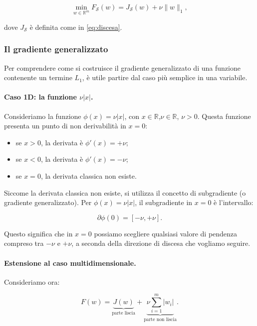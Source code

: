 \documentclass[a4paper,12pt]{article}
\numberwithin{equation}{section}
\numberwithin{figure}{section}
\numberwithin{table}{section}
\begin{document}
\begin{equation}
\min_{w \in \mathbb{R}^m} F_{\mathcal{S}}(w) = J_{\mathcal{S}}(w) + \nu \|w\|_1, \tag{5.42}\label{eq:5_42}
\end{equation}

dove $J_{\mathcal{S}}$ è definita come in \eqref{eq:discesa}.

\subsubsection{Il gradiente generalizzato}

Per comprendere come si costruisce il gradiente generalizzato di una funzione
contenente un termine $L_1$, è utile partire dal caso più semplice in una variabile.

\paragraph{Caso 1D: la funzione $\nu|x|$.}

Consideriamo la funzione $\phi(x) = \nu |x|$, con $x\in\mathbb{R}$,\newline $\nu \in\mathbb{R}$, $\nu> 0$. Questa funzione
presenta un punto di non derivabilità in $x = 0$:

\begin{itemize}
    \item se $x > 0$, la derivata è $\phi'(x) = +\nu$;
    \item se $x < 0$, la derivata è $\phi'(x) = -\nu$;
    \item se $x = 0$, la derivata classica non esiste.
\end{itemize}

Siccome la derivata classica non esiste, si utilizza
il concetto di subgradiente (o gradiente generalizzato). Per
$\phi(x) = \nu|x|$, il subgradiente in $x = 0$ è l'intervallo:

\[
\partial \phi(0) = [-\nu, +\nu].
\]

Questo significa che in $x = 0$ possiamo scegliere qualsiasi valore di pendenza
compreso tra $-\nu$ e $+\nu$, a seconda della direzione di discesa che vogliamo
seguire.

\paragraph{Estensione al caso multidimensionale.}

Consideriamo ora:

\[
F(w) = \underbrace{J(w)}_{\text{parte liscia}} + \underbrace{\nu \sum_{i=1}^m |w_i|}_{\text{parte non liscia}}.
\]
\end{document}
